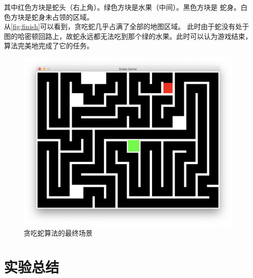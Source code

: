 \documentclass[a4paper]{article}
\begin{document}
其中红色方块是蛇头（右上角）。绿色方块是水果（中间）。黑色方块是
蛇身。白色方块是蛇身未占领的区域。\\

从\autoref{fig:finish}可以看到，贪吃蛇几乎占满了全部的地图区域。
此时由于蛇没有处于图的哈密顿回路上，故蛇永远都无法吃到那个绿的水果。此时可以认为游戏结束，
算法完美地完成了它的任务。
\begin{figure}[!hbt]
    \begin{center}
    \includegraphics[scale=0.4]{assets/finish.png}
    \caption{贪吃蛇算法的最终场景\label{fig:finish}} 
    \end{center} 
\end{figure} 

\section{实验总结}

\end{document}
